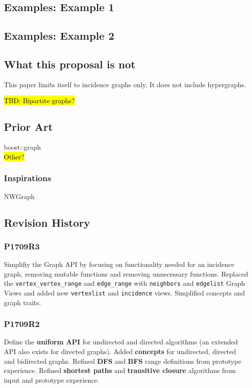 \documentclass[10pt,onecolumn]{article}
\newcommand{\tcode}[1]{\lstinline[breaklines=true]{#1}}
\begin{document}
\subsection{Examples: Example 1}
\subsection{Examples: Example 2}

\subsection{What this proposal is  \textbf{not}}
This paper limits itself to incidence graphs only. It does not include hypergraphs.

\hl{TBD: Bipartite graphs?}


\subsection{Prior Art}
boost::graph \\
\hl{Other?}

\subsubsection{Inspirations}
NWGraph

\subsection{Revision History}
\subsubsection*{P1709R3}
Simplifiy the Graph API by focusing on functionality needed for an incidence graph, removing mutable functions and removing unnecessary functions. Replaced the \tcode{vertex_vertex_range} and \tcode{edge_range} with \tcode{neighbors} and \tcode{edgelist} Graph Views and added new \tcode{vertexlist} and \tcode{incidence} views. Simplified concepts and graph traits.

\subsubsection*{P1709R2}
Define the \textbf{uniform API} for undirected and directed algorithms (an extended API also exists for directed graphs). Added \textbf{concepts} for undirected, directed and bidirected graphs. Refined \textbf{DFS} and \textbf{BFS} range definitions from prototype experience. Refined \textbf{shortest paths} and \textbf{transitive closure} algorithms from input and prototype experience.
\end{document}
